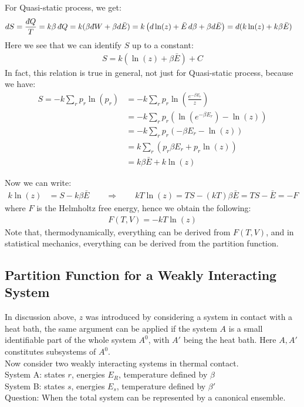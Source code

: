 \documentclass[11pt,oneside]{book}
\theoremstyle{break}
\theoremstyle{break}
\newcommand{\dbar}{d\hspace*{-0.08em}\bar{}\hspace*{0.1em}}
\begin{document}
For Quasi-static process, we get:
\begin{align*}
dS = \frac{\dbar Q}{T} = k\beta \, \dbar Q &= k(\beta \dbar W+ \beta d\bar{E})= k\left(d\ln(z) + \bar{E}\, d\beta + \beta d\bar{E}\right)= d(k\ln(z) + k\beta \bar{E})
\end{align*}
Here we see that we can identify $S$ up to a constant:
\begin{align*}
S = k\left( \ln(z) + \beta \bar{E}\right) +C
\end{align*}
In fact, this relation is true in general, not just for Quasi-static process, because we have:
\begin{align*}
S = -k\sum_r p_r \ln(p_r) &= -k\sum_r p_r \ln \left(\frac{e^{-\beta E_r}}{z} \right) \\
&= -k \sum_r p_r \left( \ln(e^{-\beta E_r}) - \ln(z)\right) \\
&= -k \sum_r p_r\left( -\beta E_r - \ln(z) \right) \\
&= k\sum_r\left( p_r \beta E_r + p_r \ln(z) \right) \\
&= k\beta \bar{E} + k \ln(z)
\end{align*}

Now we can write:
\begin{align*}
k\ln(z) &= S- k\beta \bar{E} \qquad\Rightarrow\qquad  kT\ln(z) = TS - (kT)\beta \bar{E}= TS -\bar{E}=-F 
\end{align*}
where $F$ is the Helmholtz free energy, hence we obtain the following:
\begin{align*}
F(T,V) = -kT\ln(z)
\end{align*} 
Note that, thermodynamically, everything can be derived from $F(T,V)$, and in statistical mechanics, everything can be derived from the partition function. \\
\newpage

\subsection{Partition Function for a Weakly Interacting System}
In discussion above, $z$ was introduced by considering a system in contact with a heat bath, the same argument can be applied if the system $A$ is a small identifiable part of the whole system $A^0$, with $A'$ being the heat bath. Here $A,A'$ constitutes subsystems of $A^0$.\\

Now consider two weakly interacting systems in thermal contact.\\
${}$\quad System A: states $r$, energies $E_R$, temperature defined by $\beta$\\
${}$\quad System B: states $s$, energies $E_s$, temperature defined by $\beta'$\\
Question: When the total system can be represented by a canonical ensemble.\\
 
\end{document}
